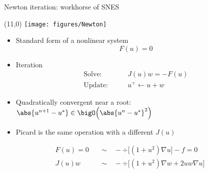 \begin{frame}{Newton iteration: workhorse of SNES}
  \begin{textblock}{3}(11,0)
    \texttt{[image: figures/Newton]}
  \end{textblock}
  \begin{itemize}
  \item Standard form of a nonlinear system
    \[ F(u) = 0 \]
  \item Iteration
    \begin{align*}
      \text{Solve:} & \qquad J(u) w = -F(u) \\
      \text{Update:} & \qquad u^+ \gets u + w
    \end{align*}
    \item Quadratically convergent near a root: $\abs{u^{n+1}-u^*} \in \bigO\Big(\abs{u^n-u^*}^2\Big)$
    \item Picard is the same operation with a different $J(u)$
  \end{itemize}
  \begin{example}
    \begin{align*}
      F(u)=0 \quad &\sim\quad -\div\big[ (1+u^2) \nabla u \big] - f = 0 \\
      J(u)w \quad &\sim\quad  -\div\big[(1+u^2)\nabla w + 2uw\nabla u \Big]
    \end{align*}
  \end{example}
\end{frame}

